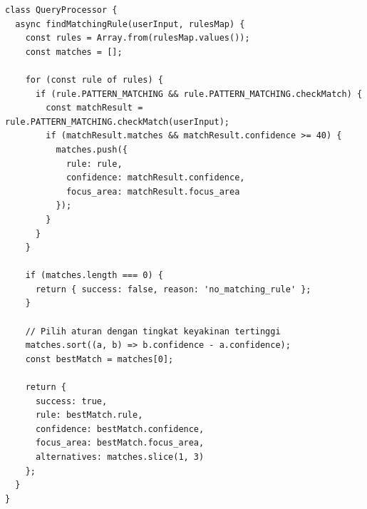 \begin{lstlisting}[caption={Pencocokan Aturan pada \textit{Query Processor}}, label={lst:query-processor}, style=jsstyle]
class QueryProcessor {
  async findMatchingRule(userInput, rulesMap) {
    const rules = Array.from(rulesMap.values());
    const matches = [];

    for (const rule of rules) {
      if (rule.PATTERN_MATCHING && rule.PATTERN_MATCHING.checkMatch) {
        const matchResult = rule.PATTERN_MATCHING.checkMatch(userInput);
        if (matchResult.matches && matchResult.confidence >= 40) {
          matches.push({
            rule: rule,
            confidence: matchResult.confidence,
            focus_area: matchResult.focus_area
          });
        }
      }
    }

    if (matches.length === 0) {
      return { success: false, reason: 'no_matching_rule' };
    }

    // Pilih aturan dengan tingkat keyakinan tertinggi
    matches.sort((a, b) => b.confidence - a.confidence);
    const bestMatch = matches[0];

    return {
      success: true,
      rule: bestMatch.rule,
      confidence: bestMatch.confidence,
      focus_area: bestMatch.focus_area,
      alternatives: matches.slice(1, 3)
    };
  }
}
\end{lstlisting}
